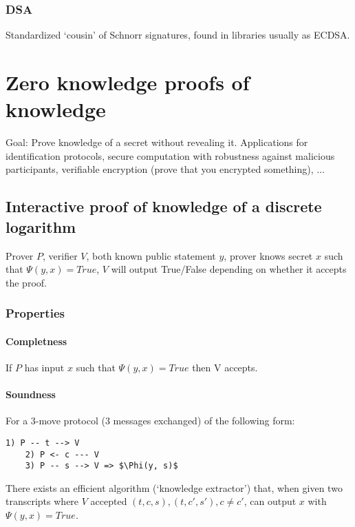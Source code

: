\documentclass[a4paper]{scrreprt}
\begin{document}
\subsection{DSA}

Standardized `cousin' of Schnorr signatures, found in libraries usually as
ECDSA.

\chapter{Zero knowledge proofs of knowledge}

Goal: Prove knowledge of a secret without revealing it. Applications for
identification protocols, secure computation with robustness against malicious
participants, verifiable encryption (prove that you encrypted something), ...

\section{Interactive proof of knowledge of a discrete logarithm}

Prover $P$, verifier $V$, both known public statement $y$, prover knows secret
$x$ such that $\Psi(y, x) = True$, $V$ will output True/False depending on
whether it accepts the proof.

\subsection{Properties}

\subsubsection{Completness}

If $P$ has input $x$ such that $\Psi(y, x) = True$ then V accepts.

\subsubsection{Soundness}

For a 3-move protocol (3 messages exchanged) of the following form:

\begin{lstlisting}[mathescape=true,autogobble=true]
	1) P -- t --> V
	2) P <- c --- V
	3) P -- s --> V => $\Phi(y, s)$
\end{lstlisting}

There exists an efficient algorithm (`knowledge extractor') that, when given
two transcripts where $V$ accepted $(t, c, s), (t, c', s'), c \neq c'$, can
output $x$ with $\Psi(y, x) = True$.
\end{document}
